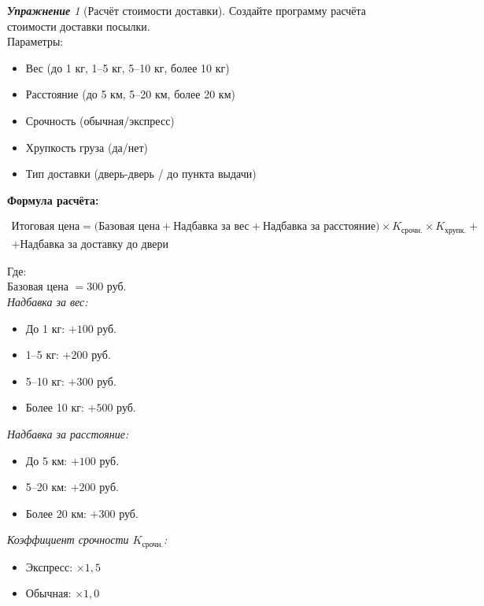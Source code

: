 \documentclass[a4paper,12pt]{article}
\theoremstyle{remark}
\newtheorem{exercise}{\textbf{Упражнение}}[section]
\begin{document}
\begin{exercise}[Расчёт стоимости доставки]
Создайте программу расчёта стоимости доставки посылки. \\
Параметры:
\begin{itemize}
    \item Вес (до 1 кг, 1--5 кг, 5--10 кг, более 10 кг)
    \item Расстояние (до 5 км, 5--20 км, более 20 км)
    \item Срочность (обычная/экспресс)
    \item Хрупкость груза (да/нет)
    \item Тип доставки (дверь-дверь / до пункта выдачи)
\end{itemize}

\noindent\textbf{Формула расчёта:}

\begin{multline*}
\text{Итоговая цена} = \bigl(\text{Базовая цена} + \text{Надбавка за вес} + \text{Надбавка за расстояние}\bigr) \times K_{\text{срочн.}} \times K_{\text{хрупк.}} + \\ + \text{Надбавка за доставку до двери}
\end{multline*}

\noindent Где: \\[4pt]
Базовая цена $= 300$ руб. \\[4pt]

\textit{Надбавка за вес:}
\begin{itemize}
    \item До 1 кг: $+100$ руб.
    \item 1--5 кг: $+200$ руб.
    \item 5--10 кг: $+300$ руб.
    \item Более 10 кг: $+500$ руб.
\end{itemize}

\textit{Надбавка за расстояние:}
\begin{itemize}
    \item До 5 км: $+100$ руб.
    \item 5--20 км: $+200$ руб.
    \item Более 20 км: $+300$ руб.
\end{itemize}

\textit{Коэффициент срочности $K_{\text{срочн.}}$:}
\begin{itemize}
    \item Экспресс: $\times 1{,}5$
    \item Обычная: $\times 1{,}0$
\end{itemize}


\end{exercise}
\end{document}
